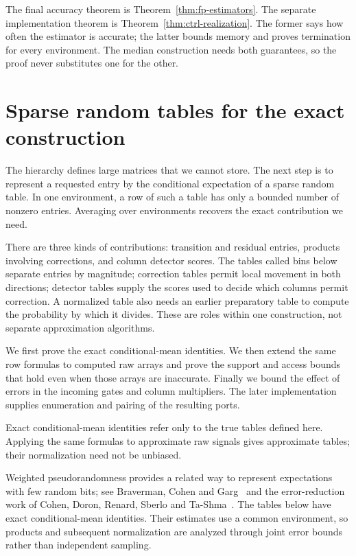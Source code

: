 \documentclass[11pt]{article}
\numberwithin{equation}{section}
\theoremstyle{definition}
\theoremstyle{remark}
\begin{document}
The final accuracy theorem is Theorem~\ref{thm:fp-estimators}. The separate implementation theorem is Theorem~\ref{thm:ctrl-realization}. The former says how often the estimator is accurate; the latter bounds memory and proves termination for every environment. The median construction needs both guarantees, so the proof never substitutes one for the other.




\section{Sparse random tables for the exact construction}
\label{sec:atom}

The hierarchy defines large matrices that we cannot store. The next step is to represent a requested entry by the conditional expectation of a sparse random table. In one environment, a row of such a table has only a bounded number of nonzero entries. Averaging over environments recovers the exact contribution we need.

There are three kinds of contributions: transition and residual entries, products involving corrections, and column detector scores. The tables called bins below separate entries by magnitude; correction tables permit local movement in both directions; detector tables supply the scores used to decide which columns permit correction. A normalized table also needs an earlier preparatory table to compute the probability by which it divides. These are roles within one construction, not separate approximation algorithms.

We first prove the exact conditional-mean identities.  We then extend the
same row formulas to computed raw arrays and prove the support and access
bounds that hold even when those arrays are inaccurate.  Finally we bound
the effect of errors in the incoming gates and column multipliers.  The
later implementation supplies enumeration and pairing of the resulting
ports.

Exact conditional-mean identities refer only to the true tables defined
here.  Applying the same formulas to approximate raw signals gives
approximate tables; their normalization need not be unbiased.

Weighted pseudorandomness provides a related way to represent expectations
with few random bits; see Braverman, Cohen and Garg~\cite{BravermanCohenGarg2020}
and the error-reduction work of Cohen, Doron, Renard, Sberlo and
Ta-Shma~\cite{CohenDoronRenardSberloTaShma2021}. The tables below have
exact conditional-mean identities. Their estimates use a common
environment, so products and subsequent normalization are analyzed
through joint error bounds rather than independent sampling.
\end{document}
